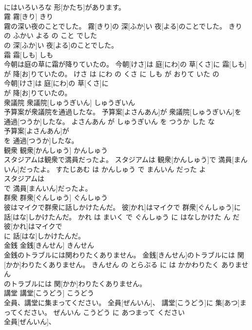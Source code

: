 \documentclass[8pt]{extreport}
\begin{document}
\begin{CJK}{UTF8}{min}
\\	にはいろいろな 形[かたち]があります。			
\\	霧	霧[きり]	きり	
\\	霧の深い夜のことでした。	霧[きり]の 深[ふか]い 夜[よる]のことでした。	きり の ふかい よる の こと でした	
\\	の 深[ふか]い 夜[よる]のことでした。			
\\	霜	霜[しも]	しも	
\\	今朝は庭の草に霜が降りていたの。	今朝[けさ]は 庭[にわ]の 草[くさ]に 霜[しも]が 降[お]りていたの。	けさ は にわ の くさ に しも が おりて いた の	
\\	今朝[けさ]は 庭[にわ]の 草[くさ]に
\\	が 降[お]りていたの。			
\\	衆議院	衆議院[しゅうぎいん]	しゅうぎいん	
\\	予算案が衆議院を通過したな。	予算案[よさんあん]が 衆議院[しゅうぎいん]を 通過[つうか]したな。	よさんあん が しゅうぎいん を つうか した な	
\\	予算案[よさんあん]が
\\	を 通過[つうか]したな。			
\\	観衆	観衆[かんしゅう]	かんしゅう	
\\	スタジアムは観衆で満員だったよ。	スタジアムは 観衆[かんしゅう]で 満員[まんいん]だったよ。	すたじあむ は かんしゅう で まんいん だった よ	
\\	スタジアムは
\\	で 満員[まんいん]だったよ。			
\\	群衆	群衆[ぐんしゅう]	ぐんしゅう	
\\	彼はマイクで群衆に話しかけたんだ。	彼[かれ]はマイクで 群衆[ぐんしゅう]に 話[はな]しかけたんだ。	かれ は まいく で ぐんしゅう に はなしかけた ん だ	
\\	彼[かれ]はマイクで
\\	に 話[はな]しかけたんだ。			
\\	金銭	金銭[きんせん]	きんせん	
\\	金銭のトラブルには関わりたくありません。	金銭[きんせん]のトラブルには 関[かか]わりたくありません。	きんせん の とらぶる に は かかわりたく ありません	
\\	のトラブルには 関[かか]わりたくありません。			
\\	講堂	講堂[こうどう]	こうどう	
\\	全員、講堂に集まってください。	全員[ぜんいん]、 講堂[こうどう]に 集[あつ]まってください。	ぜんいん こうどう に あつまって ください	
\\	全員[ぜんいん]、

\end{CJK}
\end{document}
